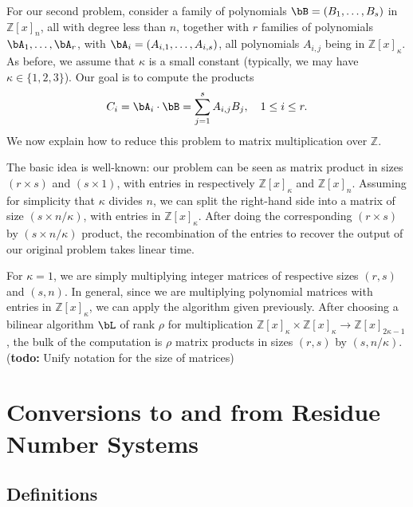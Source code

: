 \documentclass[acmtoms]{acmsmall}
\def\Z{\mathbb{Z}}
\newcommand{\todo}[1]{(\textbf{todo:} #1)}
\begin{document}
\medskip

For our second problem, consider a family of polynomials
$\bB=(B_1,\dots,B_s)$ in $\Z[x]_n$, all with degree less than $n$,
together with $r$ families of polynomials $\bA_1,\dots,\bA_r$, with
$\bA_i=(A_{i,1},\dots,A_{i,s})$, all polynomials $A_{i,j}$ being in
$\Z[x]_\kappa$. As before, we assume that $\kappa$ is a small constant
(typically, we may have $\kappa \in \{1,2,3\}$). Our goal is to
compute the products
$$C_i = \bA_i \cdot \bB = \sum_{j=1}^s A_{i,j} B_j,\quad 1 \le i \le
r.$$ We now explain how to reduce
this problem to matrix multiplication over $\Z$.

The basic idea is well-known: our problem can be seen as matrix
product in sizes $(r \times s)$ and $(s \times 1)$, with entries in
respectively $\Z[x]_\kappa$ and $\Z[x]_n$. Assuming for simplicity
that $\kappa$ divides $n$, we can split the right-hand side into a
matrix of size $(s \times n/\kappa)$, with entries in $\Z[x]_\kappa$.
After doing the corresponding $(r \times s)$ by $(s \times n/\kappa)$
product, the recombination of the entries to recover the output of
our original problem takes linear time. 

For $\kappa=1$, we are simply multiplying integer matrices of
respective sizes $(r,s)$ and $(s,n)$. In general, since we are
multiplying polynomial matrices with entries in $\Z[x]_\kappa$, we can
apply the algorithm given previously. After choosing a bilinear
algorithm $\bL$ of rank $\rho$ for
multiplication $\Z[x]_\kappa \times \Z[x]_\kappa
\to\Z[x]_{2\kappa-1}$, the bulk of the computation is 
$\rho$ matrix products in sizes $(r, s)$ by $(s, n/\kappa)$.
\todo{Unify notation for the size of matrices}


\section{Conversions to and from Residue Number Systems}


\subsection{Definitions}
\end{document}

